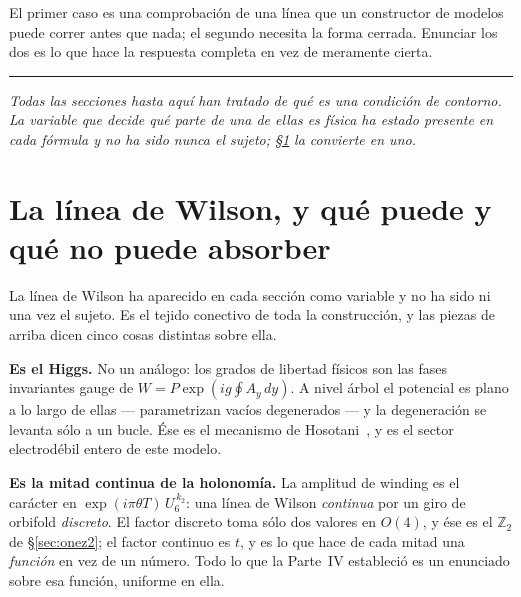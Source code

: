 \documentclass[11pt,a4paper]{article}
\newcommand{\ZZ}{\mathbb{Z}}
\newcommand{\bridge}[1]{\par\medskip\noindent
  \textcolor{hdrblue!45}{\rule{2.2cm}{0.6pt}}\;\;\parbox[t]{0.84\textwidth}{\small\itshape
  \textcolor{hdrblue!85}{#1}}\par\medskip}
\begin{document}
\begin{center}
\end{center}

\noindent El primer caso es una comprobación de una línea que un constructor de modelos puede correr
antes que nada; el segundo necesita la forma cerrada. Enunciar los dos es lo que hace la respuesta
completa en vez de meramente cierta.

\bridge{Todas las secciones hasta aquí han tratado de qué \emph{es} una condición de contorno. La
variable que decide qué parte de una de ellas es física ha estado presente en cada fórmula y no ha
sido nunca el sujeto; \S\ref{sec:wilson} la convierte en uno.}

\section{La línea de Wilson, y qué puede y qué no puede absorber}\label{sec:wilson}

La línea de Wilson ha aparecido en cada sección como variable y no ha sido ni una vez el sujeto. Es
el tejido conectivo de toda la construcción, y las piezas de arriba dicen cinco cosas distintas sobre
ella.

\textbf{Es el Higgs.} No un análogo: los grados de libertad físicos son las fases invariantes gauge
de $W=P\exp(ig\oint A_y\,dy)$. A nivel árbol el potencial es plano a lo largo de ellas ---
parametrizan vacíos degenerados --- y la degeneración se levanta sólo a un bucle. Ése es el mecanismo
de Hosotani~\cite{Hosotani}, y es el sector electrodébil entero de este modelo.

\textbf{Es la mitad continua de la holonomía.} La amplitud de winding es el carácter en
$\exp(i\pi\theta T)\,U_6^{\,k_2}$: una línea de Wilson \emph{continua} por un giro de orbifold
\emph{discreto}. El factor discreto toma sólo dos valores en $O(4)$, y ése es el $\ZZ_2$ de
\S\ref{sec:onez2}; el factor continuo es $t$, y es lo que hace de cada mitad una \emph{función} en
vez de un número. Todo lo que la Parte~IV estableció es un enunciado sobre esa función, uniforme en
ella.
\end{document}
